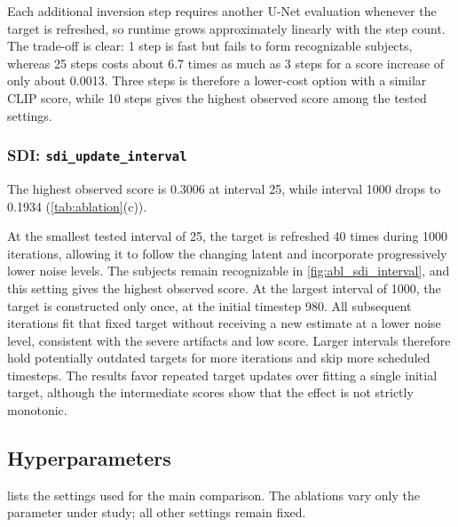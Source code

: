 Each additional inversion step requires another U-Net evaluation whenever the target is refreshed,
so runtime grows approximately linearly with the step count.
The trade-off is clear: 1 step is fast but fails to form recognizable subjects, whereas 25 steps
costs about 6.7 times as much as 3 steps for a score increase of only about 0.0013.
Three steps is therefore a lower-cost option with a similar CLIP score, while 10 steps gives the
highest observed score among the tested settings.

\subsubsection{SDI: \texttt{sdi\_update\_interval}}
\label{sec:abl_sdi_interval}

The highest observed score is 0.3006 at interval 25, while interval 1000 drops to 0.1934
(\cref{tab:ablation}(c)).

At the smallest tested interval of 25, the target is refreshed 40 times during 1000 iterations,
allowing it to follow the changing latent and incorporate progressively lower noise levels.
The subjects remain recognizable in \cref{fig:abl_sdi_interval}, and this setting gives the highest
observed score.
At the largest interval of 1000, the target is constructed only once, at the initial timestep 980.
All subsequent iterations fit that fixed target without receiving a new estimate at a lower noise
level, consistent with the severe artifacts and low score.
Larger intervals therefore hold potentially outdated targets for more iterations and skip more
scheduled timesteps.
The results favor repeated target updates over fitting a single initial target, although the
intermediate scores show that the effect is not strictly monotonic.

\subsection{Hyperparameters}
\label{sec:hparams}



 lists the settings used for the main comparison.
The ablations vary only the parameter under study; all other settings remain fixed.
